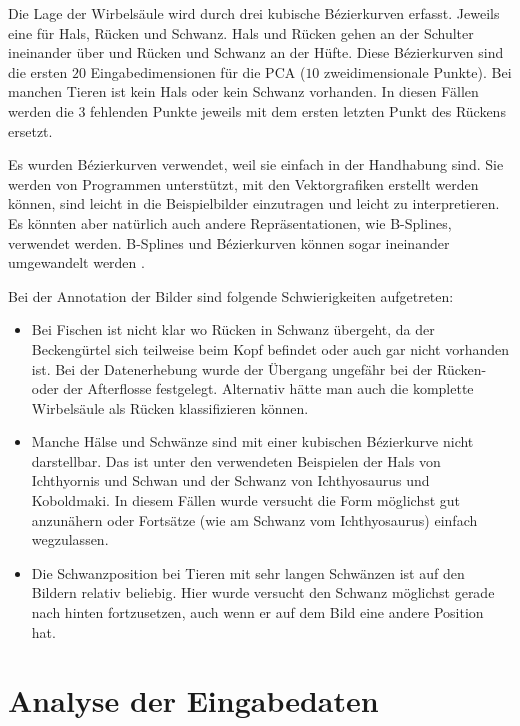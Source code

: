  Die Lage der Wirbelsäule wird durch drei kubische Bézierkurven erfasst. Jeweils eine für Hals, Rücken und Schwanz. Hals und Rücken gehen an der Schulter ineinander über und Rücken und Schwanz an der Hüfte.
 Diese Bézierkurven sind die ersten $20$ Eingabedimensionen für die PCA ($10$ zweidimensionale Punkte). Bei manchen Tieren ist kein Hals oder kein Schwanz vorhanden. In diesen Fällen werden die $3$ fehlenden Punkte jeweils mit dem ersten \bzw letzten Punkt des Rückens ersetzt.
 
 Es wurden Bézierkurven verwendet, weil sie einfach in der Handhabung sind. Sie werden von Programmen unterstützt, mit den Vektorgrafiken erstellt werden können, sind leicht in die Beispielbilder einzutragen und leicht zu interpretieren. Es könnten aber natürlich auch andere Repräsentationen, wie B-Splines, verwendet werden. B-Splines und Bézierkurven können sogar ineinander umgewandelt werden \cite{BezierAndBSplineTechniques}.
 
 Bei der Annotation der Bilder sind folgende Schwierigkeiten aufgetreten:
 \begin{itemize}
  \item Bei Fischen ist nicht klar wo Rücken in Schwanz übergeht, da der Beckengürtel sich teilweise beim Kopf befindet oder auch gar nicht vorhanden ist. Bei der Datenerhebung wurde der Übergang ungefähr bei der Rücken- oder der Afterflosse festgelegt. Alternativ hätte man auch die komplette Wirbelsäule als Rücken klassifizieren können.
  
  \item Manche Hälse und Schwänze sind mit einer kubischen Bézierkurve nicht darstellbar. Das ist unter den verwendeten Beispielen der Hals von Ichthyornis und Schwan und der Schwanz von Ichthyosaurus und Koboldmaki. In diesem Fällen wurde versucht die Form möglichst gut anzunähern oder Fortsätze (wie am Schwanz vom Ichthyosaurus) einfach wegzulassen.
  
  \item Die Schwanzposition bei Tieren mit sehr langen Schwänzen ist auf den Bildern relativ beliebig. Hier wurde versucht den Schwanz möglichst gerade nach hinten fortzusetzen, auch wenn er auf dem Bild eine andere Position hat.
 \end{itemize}
 
 
 \section{Analyse der Eingabedaten}
 \label{pca_input_analysis}
 

